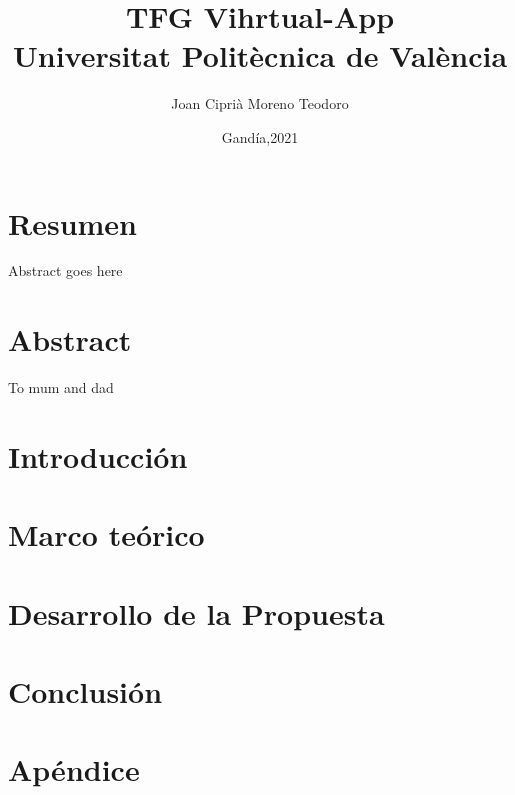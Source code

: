 \documentclass[11pt]{book}
\title{
{TFG Vihrtual-App}\\
{\large Universitat Politècnica de València}\\
}
\author{Joan Ciprià Moreno Teodoro}
\date{Gandía,2021}
\begin{document}
\maketitle

\chapter*{Resumen}
Abstract goes here

\chapter*{Abstract}
To mum and dad

\tableofcontents

\chapter{Introducción}


\chapter{Marco teórico}


\chapter{Desarrollo de la Propuesta}


\chapter{Conclusión}


\appendix
\chapter{Apéndice}

\end{document}
